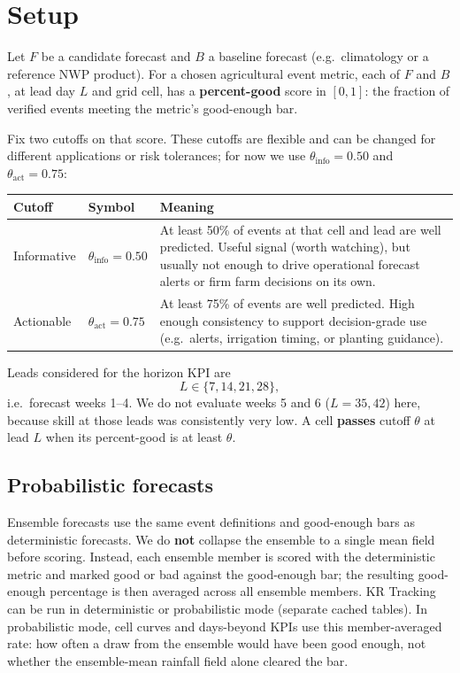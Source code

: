 \documentclass[11pt]{article}
\begin{document}
\section{Setup}

Let \(F\) be a candidate forecast and \(B\) a baseline forecast
(e.g.\ climatology or a reference NWP product). For a chosen agricultural
event metric, each of \(F\) and \(B\), at lead day \(L\) and grid cell, has a
\textbf{percent-good} score in \([0,1]\): the fraction of verified events
meeting the metric's good-enough bar.

Fix two cutoffs on that score.
These cutoffs are flexible and can be changed for different applications or
risk tolerances; for now we use \(\theta_{\mathrm{info}}=0.50\) and
\(\theta_{\mathrm{act}}=0.75\):

\begin{center}
\begin{tabular}{@{}llp{}@{}}
\toprule
Cutoff & Symbol & Meaning \\
\midrule
Informative & \(\theta_{\mathrm{info}}=0.50\)
  & At least 50\% of events at that cell and lead are well predicted.
    Useful signal (worth watching), but usually not enough to drive
    operational forecast alerts or firm farm decisions on its own. \\
\addlinespace
Actionable & \(\theta_{\mathrm{act}}=0.75\)
  & At least 75\% of events are well predicted.
    High enough consistency to support decision-grade use
    (e.g.\ alerts, irrigation timing, or planting guidance). \\
\bottomrule
\end{tabular}
\end{center}

Leads considered for the horizon KPI are
\[
L \in \{7,14,21,28\},
\]
i.e.\ forecast weeks 1--4. We do not evaluate weeks 5 and 6 (\(L=35,42\))
here, because skill at those leads was consistently very low.
A cell \textbf{passes} cutoff \(\theta\) at lead \(L\) when its percent-good is
at least \(\theta\).

\subsection*{Probabilistic forecasts}

Ensemble forecasts use the same event definitions and good-enough bars as
deterministic forecasts. We do \textbf{not} collapse the ensemble to a single
mean field before scoring. Instead, each ensemble member is scored with the
deterministic metric and marked good or bad against the good-enough bar; the
resulting good-enough percentage is then averaged across all ensemble members.
KR Tracking can be run in deterministic or probabilistic mode (separate cached
tables). In probabilistic mode, cell curves and days-beyond KPIs use this
member-averaged rate: how often a draw from the ensemble would have been good
enough, not whether the ensemble-mean rainfall field alone cleared the bar.
\end{document}
